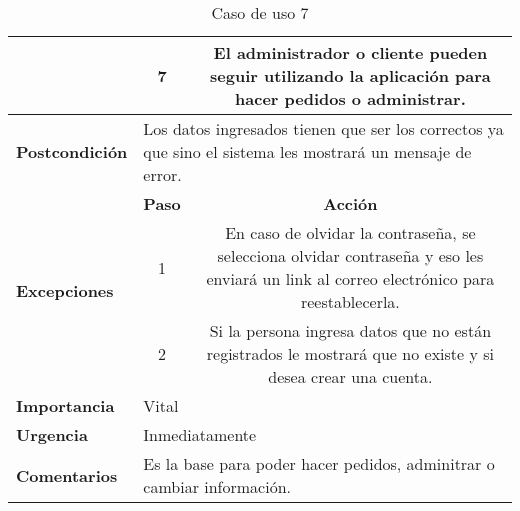 \documentclass[conference]{IEEEtran}
\begin{document}
\begin{table}[H]
\begin{adjustbox}{width=0.47\textwidth}
\begin{tabular}{|p{11.215em}|p{5.355em}|c|}
\cmidrule{2-3}    \multicolumn{1}{|c|}{} & \multicolumn{1}{c|}{7} & \multicolumn{1}{p{32em}|}{El administrador o cliente pueden seguir utilizando la aplicación para hacer pedidos o administrar.} \\
    \midrule
    \textbf{Postcondición} & \multicolumn{2}{p{37.355em}|}{Los datos ingresados tienen que ser los correctos ya que sino el sistema les mostrará un mensaje de error.} \\
    \midrule
    \multirow{4}[6]{*}{\textbf{Excepciones}} & \textbf{Paso} & \multicolumn{1}{p{32em}|}{\textbf{Acción}} \\
\cmidrule{2-3}    \multicolumn{1}{|c|}{} & \multicolumn{1}{c|}{\multirow{2}[2]{*}{1}} & \multicolumn{1}{c|}{\multirow{2}[2]{*}{En caso de olvidar la contraseña, se selecciona olvidar contraseña y eso les enviará un link al correo electrónico para reestablecerla.}} \\
    \multicolumn{1}{|c|}{} & \multicolumn{1}{c|}{} &  \\
\cmidrule{2-3}    \multicolumn{1}{|c|}{} & \multicolumn{1}{c|}{2} & \multicolumn{1}{p{32em}|}{Si la persona ingresa datos que no están registrados le mostrará que no existe y si desea crear una cuenta.} \\
    \midrule
    \textbf{Importancia} & \multicolumn{2}{p{37.355em}|}{Vital} \\
    \midrule
    \textbf{Urgencia} & \multicolumn{2}{p{37.355em}|}{Inmediatamente} \\
    \midrule
    \textbf{Comentarios} & \multicolumn{2}{p{37.355em}|}{Es la base para poder hacer pedidos, adminitrar o cambiar información.} \\
    \bottomrule
    \end{tabular}%
    \end{adjustbox}
    \vspace{0.3cm}
    \caption{Caso de uso 7}
  \label{tab:addlabel}%
\end{table}%
\end{document}
